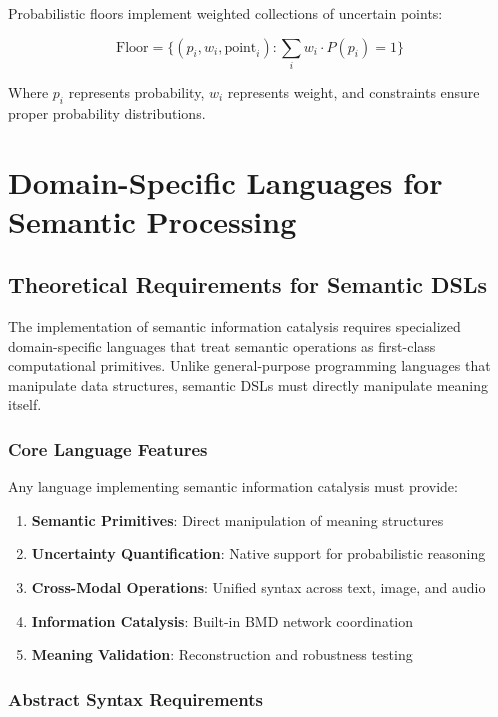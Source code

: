 \documentclass[12pt,a4paper,twoside]{article}
\begin{document}
Probabilistic floors implement weighted collections of uncertain points:

\begin{equation}
\text{Floor} = \{(p_i, w_i, \text{point}_i) : \sum_{i} w_i \cdot P(p_i) = 1\}
\end{equation}

Where $p_i$ represents probability, $w_i$ represents weight, and constraints ensure proper probability distributions.

\section{Domain-Specific Languages for Semantic Processing}

\subsection{Theoretical Requirements for Semantic DSLs}

The implementation of semantic information catalysis requires specialized domain-specific languages that treat semantic operations as first-class computational primitives. Unlike general-purpose programming languages that manipulate data structures, semantic DSLs must directly manipulate meaning itself.

\subsubsection{Core Language Features}

Any language implementing semantic information catalysis must provide:

\begin{enumerate}
\item \textbf{Semantic Primitives}: Direct manipulation of meaning structures
\item \textbf{Uncertainty Quantification}: Native support for probabilistic reasoning
\item \textbf{Cross-Modal Operations}: Unified syntax across text, image, and audio
\item \textbf{Information Catalysis}: Built-in BMD network coordination
\item \textbf{Meaning Validation}: Reconstruction and robustness testing
\end{enumerate}

\subsubsection{Abstract Syntax Requirements}
\end{document}
